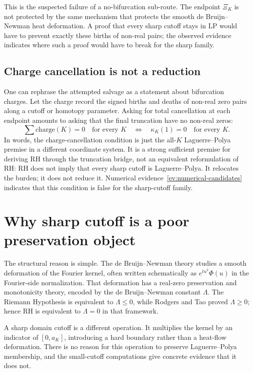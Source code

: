 \documentclass[11pt]{article}
\newcommand{\LP}{\mathrm{LP}}
\begin{document}
This is the suspected failure of a no-bifurcation sub-route.  The endpoint
$\Xi_K$ is not
protected by the same mechanism that protects the smooth de Bruijn--Newman
heat deformation.  A proof that every sharp cutoff stays in $\LP$ would have
to prevent exactly these births of non-real pairs; the observed evidence
indicates where such a proof would have to break for the sharp family.

\subsection{Charge cancellation is not a reduction}

One can rephrase the attempted salvage as a statement about bifurcation
charges.  Let the charge record the signed births and deaths of non-real zero
pairs along a cutoff or homotopy parameter.  Asking for total cancellation at
each endpoint amounts to asking that the final truncation have no non-real
zeros:
$$
  \sum \text{charge}(K)=0
  \quad\text{for every }K
  \quad\Longleftrightarrow\quad
  \kappa_K(1)=0
  \quad\text{for every }K .
$$
In words, the charge-cancellation condition is just the all-$K$
Laguerre--Polya premise in a different coordinate system.  It is a strong
sufficient premise for deriving RH through the truncation bridge, not an
equivalent reformulation of RH: RH does not imply that every sharp cutoff is
Laguerre--Polya.  It relocates the burden; it does not reduce it.  Numerical
evidence~\ref{ev:numerical-candidates} indicates that this condition is false
for the sharp-cutoff family.

\section{Why sharp cutoff is a poor preservation object}

The structural reason is simple.  The de Bruijn--Newman theory studies a
smooth deformation of the Fourier kernel, often written schematically as
$e^{tu^2}\Phi(u)$ in the Fourier-side normalization.  That deformation has a
real-zero preservation and monotonicity theory, encoded by the
de Bruijn--Newman constant $\Lambda$.  The Riemann Hypothesis is equivalent to
$\Lambda\leq0$, while Rodgers and Tao proved $\Lambda\geq0$; hence RH is
equivalent to $\Lambda=0$ in that framework.

A sharp domain cutoff is a different operation.  It multiplies the kernel by
an indicator of $[0,a_K]$, introducing a hard boundary rather than a heat-flow
deformation.  There is no reason for this operation to preserve
Laguerre--Polya membership, and the small-cutoff computations give concrete
evidence that it does not.
\end{document}
